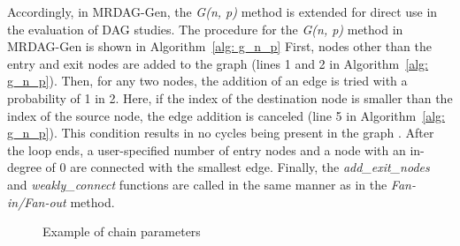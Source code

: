 Accordingly, in MRDAG-Gen, the {\it G(n, p)} method is extended for direct use in the evaluation of DAG studies.
The procedure for the {\it G(n, p)} method in MRDAG-Gen is shown in Algorithm~\ref{alg: g_n_p}
First, nodes other than the entry and exit nodes are added to the graph (lines 1 and 2 in Algorithm~\ref{alg: g_n_p}).
Then, for any two nodes, the addition of an edge is tried with a probability of 1 in 2.
Here, if the index of the destination node is smaller than the index of the source node, the edge addition is canceled (line 5 in Algorithm~\ref{alg: g_n_p}).
This condition results in no cycles being present in the graph \cite{voronov2021ai, agrawal2020hard}.
After the loop ends, a user-specified number of entry nodes and a node with an in-degree of 0 are connected with the smallest edge.
Finally, the {\it add\_exit\_nodes} and {\it weakly\_connect} functions are called in the same manner as in the {\it Fan-in/Fan-out} method.


\begin{figure}[tb]
    \centering
    \caption{Example of chain parameters}
    \label{fig: chain_param_exam}
\end{figure}


